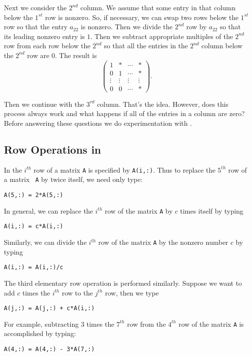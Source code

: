 Next we consider the $2^{nd}$ column.  We assume that some entry
in that column below the $1^{st}$ row is nonzero.  So, if
necessary, we can swap two rows below the $1^{st}$ row so
that the entry $a_{22}$ is nonzero.  Then we divide the $2^{nd}$
row by $a_{22}$ so that its leading nonzero entry is $1$.  Then
we subtract appropriate multiples of the $2^{nd}$ row from each
row below the $2^{nd}$ so that all the entries in the $2^{nd}$
column below the $2^{nd}$ row are $0$.  The result is
\[
\left(\begin{array}{cccc}  1 & * & \cdots & * \\
0 & 1 & \cdots & * \\ \vdots & \vdots & \vdots & \vdots \\
0 & 0 & \cdots & * \end{array} \right).
\]

Then we continue with the $3^{rd}$ column.  That's the idea.  However,
does this process always work and what happens if all of the entries
in a column are zero?  Before answering these questions we do
experimentation with \Matlabp.

\subsection*{Row Operations in \Matlab}

In \Matlab the $i^{th}$ row of a matrix {\tt A} is specified by
{\tt A(i,:)}.  Thus to replace the $5^{th}$ row of a matrix {\tt
A} by twice itself, we need only type:
\begin{verbatim}
A(5,:) = 2*A(5,:)
\end{verbatim}
In general, we can replace the $i^{th}$ row of the matrix
{\tt A} by $c$ times itself by typing
\begin{verbatim}
A(i,:) = c*A(i,:)
\end{verbatim}
Similarly, we can divide the $i^{th}$ row of the matrix {\tt A}
by the nonzero number $c$ by typing
\begin{verbatim}
A(i,:) = A(i,:)/c
\end{verbatim}

The third elementary row operation is performed similarly.
Suppose we want to add $c$ times the $i^{th}$ row to the
$j^{th}$ row, then we type
\begin{verbatim}
A(j,:) = A(j,:) + c*A(i,:)
\end{verbatim}
For example, subtracting $3$ times the $7^{th}$ row from the
$4^{th}$ row of the matrix {\tt A} is accomplished by typing:
\begin{verbatim}
A(4,:) = A(4,:) - 3*A(7,:)
\end{verbatim}

